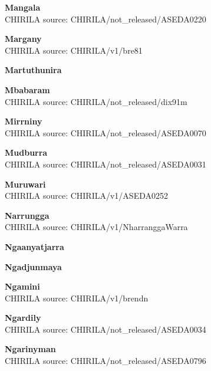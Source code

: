 \textbf{Mangala}\\
CHIRILA source: CHIRILA/not\_released/ASEDA0220


\textbf{Margany}\\
CHIRILA source: CHIRILA/v1/bre81


\textbf{Martuthunira}\\

\textbf{Mbabaram}\\
CHIRILA source: CHIRILA/not\_released/dix91m


\textbf{Mirrniny}\\
CHIRILA source: CHIRILA/not\_released/ASEDA0070


\textbf{Mudburra}\\
CHIRILA source: CHIRILA/not\_released/ASEDA0031


\textbf{Muruwari}\\
CHIRILA source: CHIRILA/v1/ASEDA0252


\textbf{Narrungga}\\
CHIRILA source: CHIRILA/v1/NharranggaWarra


\textbf{Ngaanyatjarra}\\

\textbf{Ngadjunmaya}\\

\textbf{Ngamini}\\
CHIRILA source: CHIRILA/v1/brendn


\textbf{Ngardily}\\
CHIRILA source: CHIRILA/not\_released/ASEDA0034


\textbf{Ngarinyman}\\
CHIRILA source: CHIRILA/not\_released/ASEDA0796


